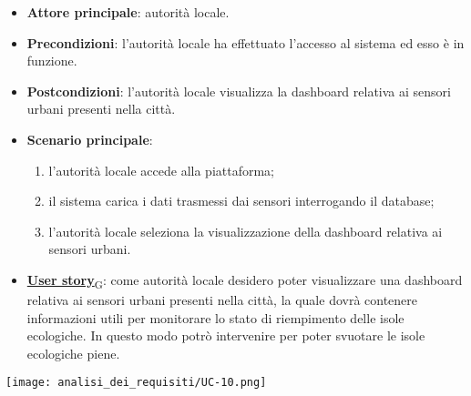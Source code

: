 \begin{itemize}
	\item \textbf{Attore principale}: autorità locale.
	\item \textbf{Precondizioni}: l'autorità locale ha effettuato l'accesso al sistema ed esso è in funzione.
	\item \textbf{Postcondizioni}: l'autorità locale visualizza la dashboard relativa
	      ai sensori urbani presenti nella città.
	\item \textbf{Scenario principale}:
	      \begin{enumerate}
		      \item l'autorità locale accede alla piattaforma;
		      \item il sistema carica i dati trasmessi dai sensori interrogando il database;
		      \item l'autorità locale seleziona la visualizzazione della dashboard relativa ai sensori urbani.
	      \end{enumerate}
	\item \href{https://7last.github.io/docs/pb/documentazione-interna/glossario\#user-story}{\textbf{User story}\textsubscript{G}}:
	      come autorità locale desidero poter visualizzare una dashboard relativa ai sensori urbani presenti nella città, la quale
	      dovrà contenere informazioni utili per monitorare lo stato di riempimento delle isole ecologiche. In questo modo potrò intervenire
	      per poter svuotare le isole ecologiche piene.
\end{itemize}
\begin{center}
	\texttt{[image: analisi\_dei\_requisiti/UC-10.png]}
\end{center}



